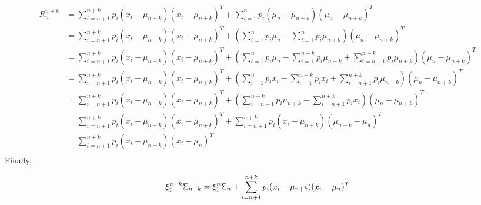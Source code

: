 \documentclass[a4paper, 11pt]{article}
\begin{document}
\begin{align*}
  R_n^{n+k}
  &=
    \sum_{i = n+1}^{n+k} p_i (x_i - \mu_{n+k}) (x_i - \mu_{n+k})^T +
    \sum_{i=1}^{n} p_i
    (\mu_{n} - \mu_{n+k}) (\mu_{n} - \mu_{n+k})^T \\
  &=
    \sum_{i = n+1}^{n+k} p_i (x_i - \mu_{n+k}) (x_i - \mu_{n+k})^T +
    \left(\sum_{i=1}^{n} p_i \mu_{n} - \sum_{i=1}^{n} p_i \mu_{n+k} \right)
     (\mu_{n} - \mu_{n+k})^T \\
  &=
    \sum_{i = n+1}^{n+k} p_i (x_i - \mu_{n+k}) (x_i - \mu_{n+k})^T +
    \left(\sum_{i=1}^{n} p_i \mu_{n} - \sum_{i=1}^{n+k} p_i \mu_{n+k} + \sum_{i=n+1}^{n+k} p_i \mu_{n+k} \right)
     (\mu_{n} - \mu_{n+k})^T \\
  &=
    \sum_{i = n+1}^{n+k} p_i (x_i - \mu_{n+k}) (x_i - \mu_{n+k})^T +
    \left(\sum_{i=1}^{n} p_i x_i - \sum_{i=1}^{n+k} p_i x_i + \sum_{i=n+1}^{n+k} p_i \mu_{n+k} \right)
     (\mu_{n} - \mu_{n+k})^T \\
  &=
    \sum_{i = n+1}^{n+k} p_i (x_i - \mu_{n+k}) (x_i - \mu_{n+k})^T +
    \left(
    \sum_{i=n+1}^{n+k} p_i \mu_{n+k} -
    \sum_{i=n+1}^{n+k} p_i x_i
    \right)
     (\mu_{n} - \mu_{n+k})^T \\
  &=
    \sum_{i = n+1}^{n+k} p_i (x_i - \mu_{n+k}) (x_i - \mu_{n+k})^T +
    \sum_{i = n+1}^{n+k} p_i (x_i - \mu_{n+k}) (\mu_{n+k} - \mu_{n})^T \\
  &=
    \sum_{i = n+1}^{n+k} p_i (x_i - \mu_{n+k}) (x_i - \mu_{n})^T \\
\end{align*}
Finally,
\begin{framed}
\begin{displaymath}
  \xi_{1}^{n + k} \Sigma_{n + k}
  = \xi_{1}^{n} \Sigma_{n} +
  \sum_{i = n+1}^{n+k} p_i (x_i - \mu_{n+k}) (x_i - \mu_{n})^T \\
\end{displaymath}
\end{framed}


\end{document}
